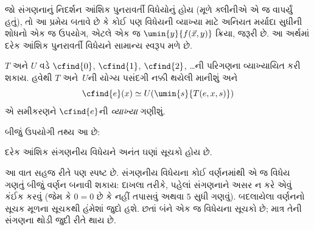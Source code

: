 \documentclass[../../../include/open-logic-section]{subfiles}
\begin{document}
જો સંગણનાનું નિદર્શન આંશિક પુનરાવર્તી વિધેયોનું હોય (મૂળે
ક્લીનીએ એ જ વાપર્યું હતું), તો આ પ્રમેય બતાવે છે કે કોઈ પણ
વિધેયની વ્યાખ્યા માટે અનિયત મર્યાદા સુધીની શોધનો એક જ ઉપયોગ,
એટલે એક જ $\umin{y}{f(\vec x,y)}$ ક્રિયા, જરૂરી છે. આ અર્થમાં
દરેક આંશિક પુનરાવર્તી વિધેયને સામાન્ય સ્વરૂપ મળે છે.

$T$ અને $U$ વડે $\cfind{0}$, $\cfind{1}$, $\cfind{2}$, \dots{}ની
પરિગણના વ્યાખ્યાયિત કરી શકાય. હવેથી $T$ અને~$U$ની યોગ્ય પસંદગી
નક્કી થયેલી માનીશું અને
\[
\cfind{e}(x) \simeq U(\umin{s}{T(e,x,s)})
\]
એ સમીકરણને $\cfind{e}$ની \emph{વ્યાખ્યા} ગણીશું.

બીજું ઉપયોગી તથ્ય આ છે:

\begin{thm}
દરેક આંશિક સંગણનીય વિધેયને અનંત ઘણાં સૂચકો હોય છે.
\end{thm}

આ વાત સહજ રીતે પણ સ્પષ્ટ છે. સંગણનીય વિધેયના કોઈ વર્ણનમાંથી
એ જ વિધેય ગણતું બીજું વર્ણન બનાવી શકાય: દાખલા તરીકે, પહેલાં
સંગણનાને અસર ન કરે એવું કંઈક કરવું (જેમ કે $0=0$ છે કે નહીં
તપાસવું અથવા $5$ સુધી ગણવું). બદલાયેલા વર્ણનનો સૂચક મૂળના
સૂચકથી હંમેશાં જુદો હશે. છતાં બંને એક જ વિધેયના સૂચકો છે;
માત્ર તેની સંગણના થોડી જુદી રીતે થાય છે.
\end{document}
